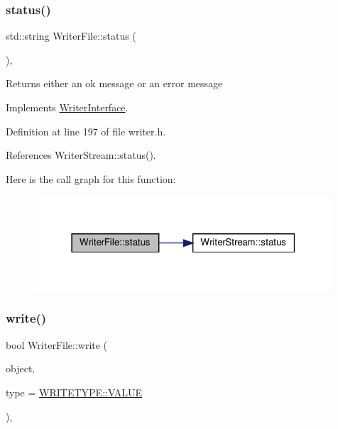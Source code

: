 \subsubsection{\texorpdfstring{status()}{status()}}
{\footnotesize\ttfamily std\+::string Writer\+File\+::status (\begin{DoxyParamCaption}{ }\end{DoxyParamCaption})\hspace{0.3cm}{\ttfamily [inline]}, {\ttfamily [virtual]}}

\begin{DoxyReturn}{Returns}
either an ok message or an error message 
\end{DoxyReturn}


Implements \hyperlink{classWriterInterface_a8865a526bb8c67ff4c96f25fc8217c81}{Writer\+Interface}.



Definition at line 197 of file writer.\+h.



References Writer\+Stream\+::status().

Here is the call graph for this function\+:
\nopagebreak
\begin{figure}[H]
\begin{center}
\leavevmode
\includegraphics[width=315pt]{classWriterFile_a538dd7bd3be5c0f3b930f215bf9f6ca7_cgraph}
\end{center}
\end{figure}
\mbox{\label{classWriterFile_ac540d18943353e011428124a5afcc393}} 
\subsubsection{\texorpdfstring{write()}{write()}}
{\footnotesize\ttfamily bool Writer\+File\+::write (\begin{DoxyParamCaption}\item[{const std\+::string \&}]{object,  }\item[{const \hyperlink{classWriterInterface_af35706b761b016972144a9333637d93d}{W\+R\+I\+T\+E\+T\+Y\+PE} \&}]{type = {\ttfamily \hyperlink{classWriterInterface_af35706b761b016972144a9333637d93daecc2e9c313faddb07e7da223c1dc5c3f}{W\+R\+I\+T\+E\+T\+Y\+P\+E\+::\+V\+A\+L\+UE}} }\end{DoxyParamCaption})\hspace{0.3cm}{\ttfamily [inline]}, {\ttfamily [virtual]}}



